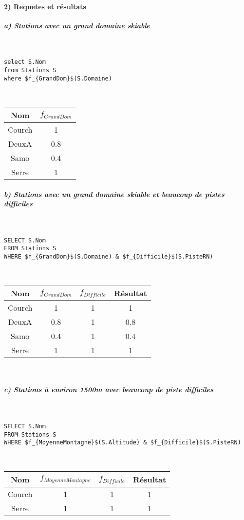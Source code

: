 \documentclass[a4paper,11pt]{article}
\begin{document}
\paragraph{2) Requetes et résultats}

\subparagraph{a) Stations avec un grand domaine skiable} ~\\
\begin{lstlisting}[mathescape]
select S.Nom
from Stations S
where $f_{GrandDom}$(S.Domaine)
\end{lstlisting}
~

\begin{tabular}{|c|c|}
	\hline 
	\textbf{Nom} & $f_{GrandDom}$ \\ 
	\hline 
	\hline
	Courch & 1 \\ 
	\hline 
	DeuxA & 0.8 \\ 
	\hline 
	Samo & 0.4 \\ 
	\hline 
	Serre & 1 \\ 
	\hline 
\end{tabular}

\subparagraph{b) Stations avec un grand domaine skiable et beaucoup de pistes difficiles} ~\\
\begin{lstlisting}[mathescape]
SELECT S.Nom
FROM Stations S
WHERE $f_{GrandDom}$(S.Domaine) & $f_{Difficile}$(S.PisteRN)
\end{lstlisting}
~

\begin{tabular}{|c|c|c|c|}
	\hline 
	\textbf{Nom} & $f_{GrandDom}$ & $f_{Difficile}$ & \textbf{Résultat} \\ 
	\hline
	\hline
	Courch & 1 & 1 & 1 \\ 
	\hline 
	DeuxA & 0.8 & 1 & 0.8 \\ 
	\hline 
	Samo & 0.4 & 1 & 0.4 \\ 
	\hline 
	Serre & 1 & 1 & 1 \\ 
	\hline 
\end{tabular}
~\\

\subparagraph{c) Stations à environ 1500m avec beaucoup de piste difficiles} ~\\

\begin{lstlisting}[mathescape]
SELECT S.Nom
FROM Stations S
WHERE $f_{MoyenneMontagne}$(S.Altitude) & $f_{Difficile}$(S.PisteRN)
\end{lstlisting}
~

\begin{tabular}{|c|c|c|c|}
	\hline 
	\textbf{Nom} & $f_{MoyenneMontagne}$ & $f_{Difficile}$ & \textbf{Résultat} \\ 
	\hline 
	\hline
	Courch & 1 & 1 & 1 \\ 
	\hline 
	Serre & 1 & 1 & 1 \\ 
	\hline 
\end{tabular}
~
\end{document}
